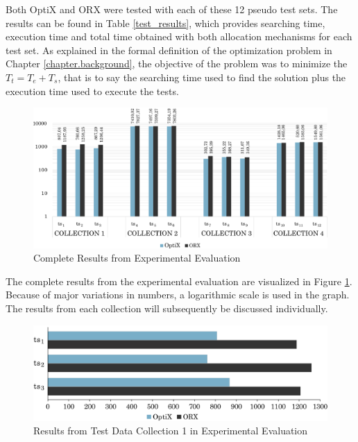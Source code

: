 Both OptiX and ORX were tested with each of these 12 pseudo test sets. The results can be found in Table \ref{test_results}, which provides searching time, execution time and total time obtained with both allocation mechanisms for each test set. As explained in the formal definition of the optimization problem in Chapter \ref{chapter.background}, the objective of the problem was to minimize the $T_{t} = T_{e} + T_{s}$, that is to say the searching time used to find the solution plus the execution time used to execute the tests.

\begin{landscape}
    \begin{figure}[p]
        \centering
        \includegraphics[scale=0.82]{figures/test_results/all.pdf}
        \caption{Complete Results from Experimental Evaluation}
        \label{fig.expres}
    \end{figure}
\end{landscape}

The complete results from the experimental evaluation are visualized in Figure \ref{fig.expres}. Because of major variations in numbers, a logarithmic scale is used in the graph. The results from each collection will subsequently be discussed individually.

\begin{figure}[t]
    \centering
    \includegraphics[width=\textwidth]{figures/test_results/1.pdf}
    \caption{Results from Test Data Collection 1 in Experimental Evaluation}
    \label{1st_test_set}
\end{figure}

